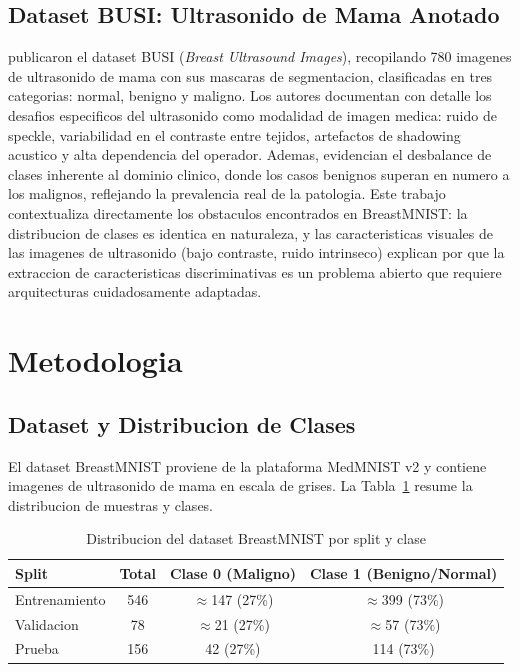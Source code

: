 \documentclass[12pt, a4paper]{article}
\begin{document}
\subsection{Dataset BUSI: Ultrasonido de Mama Anotado}

\citet{aldhabyani2020busi} publicaron el dataset BUSI (\textit{Breast Ultrasound Images}), recopilando 780 imagenes de ultrasonido de mama con sus mascaras de segmentacion, clasificadas en tres categorias: normal, benigno y maligno. Los autores documentan con detalle los desafios especificos del ultrasonido como modalidad de imagen medica: ruido de speckle, variabilidad en el contraste entre tejidos, artefactos de shadowing acustico y alta dependencia del operador. Ademas, evidencian el desbalance de clases inherente al dominio clinico, donde los casos benignos superan en numero a los malignos, reflejando la prevalencia real de la patologia. Este trabajo contextualiza directamente los obstaculos encontrados en BreastMNIST: la distribucion de clases es identica en naturaleza, y las caracteristicas visuales de las imagenes de ultrasonido (bajo contraste, ruido intrinseco) explican por que la extraccion de caracteristicas discriminativas es un problema abierto que requiere arquitecturas cuidadosamente adaptadas.

\section{Metodologia}

\subsection{Dataset y Distribucion de Clases}

El dataset BreastMNIST proviene de la plataforma MedMNIST v2 \citep{yang2023medmnist} y contiene imagenes de ultrasonido de mama en escala de grises. La Tabla~\ref{tab:distribucion} resume la distribucion de muestras y clases.

\begin{table}[H]
\centering
\caption{Distribucion del dataset BreastMNIST por split y clase}
\label{tab:distribucion}
\begin{tabular}{lccc}
\toprule
\textbf{Split} & \textbf{Total} & \textbf{Clase 0 (Maligno)} & \textbf{Clase 1 (Benigno/Normal)} \\
\midrule
Entrenamiento & 546  & $\approx$147 (27\%) & $\approx$399 (73\%) \\
Validacion    & 78   & $\approx$21 (27\%)  & $\approx$57 (73\%)  \\
Prueba        & 156  & 42 (27\%)           & 114 (73\%)          \\
\bottomrule
\end{tabular}
\end{table}
\end{document}
